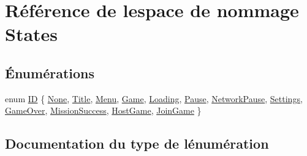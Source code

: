 \hypertarget{namespace_states}{}\section{Référence de l\textquotesingle{}espace de nommage States}
\label{namespace_states}
\subsection*{Énumérations}
\begin{DoxyCompactItemize}
\item 
enum \hyperlink{namespace_states_a571a0dc62822f97bb9511eb013d8e1c3}{ID} \{ \newline
\hyperlink{namespace_states_a571a0dc62822f97bb9511eb013d8e1c3ae18ebe696f4559ff77e50030089b4787}{None}, 
\hyperlink{namespace_states_a571a0dc62822f97bb9511eb013d8e1c3abe3968e68fb767032bf86cf4b08cb9e4}{Title}, 
\hyperlink{namespace_states_a571a0dc62822f97bb9511eb013d8e1c3a3d097da841211f87096e55962a1bd73f}{Menu}, 
\hyperlink{namespace_states_a571a0dc62822f97bb9511eb013d8e1c3a392b686639cb98b586bf0af7dc993633}{Game}, 
\newline
\hyperlink{namespace_states_a571a0dc62822f97bb9511eb013d8e1c3a2ab6dc64ee021d85a7be33ed811329df}{Loading}, 
\hyperlink{namespace_states_a571a0dc62822f97bb9511eb013d8e1c3a7cbdc18ae28451f619eac360e384790a}{Pause}, 
\hyperlink{namespace_states_a571a0dc62822f97bb9511eb013d8e1c3af63573108c6bb11f9fc7f2736d6ef395}{Network\+Pause}, 
\hyperlink{namespace_states_a571a0dc62822f97bb9511eb013d8e1c3a610e4d84289bae4aaba71902755f3b8f}{Settings}, 
\newline
\hyperlink{namespace_states_a571a0dc62822f97bb9511eb013d8e1c3aaabd0afadbb54ab3303b181859fea757}{Game\+Over}, 
\hyperlink{namespace_states_a571a0dc62822f97bb9511eb013d8e1c3a442f558ed26fad5beb0d95f74ca81bd0}{Mission\+Success}, 
\hyperlink{namespace_states_a571a0dc62822f97bb9511eb013d8e1c3a8ec818c1b804004b9513e5e6957090ae}{Host\+Game}, 
\hyperlink{namespace_states_a571a0dc62822f97bb9511eb013d8e1c3a66bda037486b2964b91dc0f634a26fd5}{Join\+Game}
 \}
\end{DoxyCompactItemize}


\subsection{Documentation du type de l\textquotesingle{}énumération}
\hypertarget{namespace_states_a571a0dc62822f97bb9511eb013d8e1c3}{}\label{namespace_states_a571a0dc62822f97bb9511eb013d8e1c3} 
